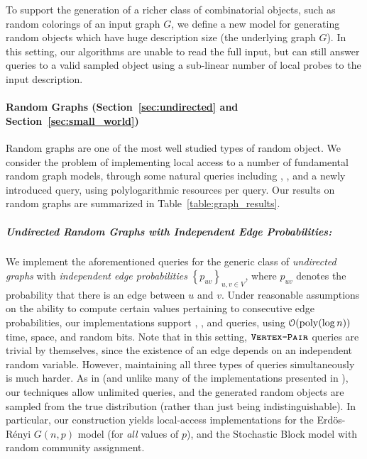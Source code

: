 To support the generation of a richer class of combinatorial objects, such as random colorings of an input graph $G$,
we define a new model for generating random objects which have huge description size (the underlying graph $G$).
In this setting, our algorithms are unable to read the full input,
but can still answer queries to a valid sampled object using a sub-linear number of local probes to the input description.





\paragraph*{Random Graphs (Section~\ref{sec:undirected} and Section~\ref{sec:small_world})}%
\label{par:random_graphs}
Random graphs are one of the most well studied types of random object.
We consider the problem of implementing local access to a number of fundamental random graph models,
through some natural queries including , ,
and a newly introduced  query, using polylogarithmic resources per query.
Our results on random graphs are summarized in Table~\ref{table:graph_results}.

\subparagraph*{Undirected Random Graphs with Independent Edge Probabilities:}
\label{par:undirected_random_graphs_with_independent_edge_probabilities}
We implement the aforementioned queries for the generic class of \emph{undirected graphs} with \emph{independent edge probabilities}
$\left\{ p_{uv} \right\}_{u,v\in V}$, where $p_{uv}$ denotes the probability that there is an edge between $u$ and $v$.
Under reasonable assumptions on the ability to compute certain values pertaining to consecutive edge probabilities,
our implementations support , , and  queries,
using $\mathcal{O}(\mathrm{poly}(\log n))$ time, space, and random bits.
Note that in this setting, $\texttt{\textsc{Vertex-Pair}}$ queries are trivial by themselves,
since the existence of an edge depends on an independent random variable.
However, maintaining all three types of queries simultaneously is much harder.
As in \cite{reut} (and unlike many of the implementations presented in \cite{huge_old,huge}), our techniques allow unlimited queries,
and the generated random objects are sampled from the true distribution (rather than just being indistinguishable).
In particular, our construction yields local-access implementations for the Erd\"{o}s-R\'{e}nyi $G(n,p)$ model (for \emph{all} values of $p$),
and the Stochastic Block model with random community assignment.


